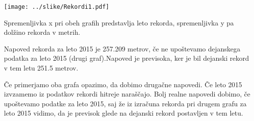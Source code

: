 \documentclass[11pt,a4paper]{article}
\begin{document}
\texttt{[image: ../slike/Rekordi1.pdf]}

Spremenljivka x pri obeh grafih predstavlja leto rekorda, spremenljivka y pa dolžino rekorda v metrih.

Napoved rekorda za leto 2015 je 257.209 metrov, če ne upoštevamo dejanskega podatka za leto 2015 (drugi graf).Napoved je previsoka, ker je bil dejanski rekord v tem letu 251.5 metrov.

Če primerjamo oba grafa opazimo, da dobimo drugačne napovedi. Če leto 2015 izvzamemo iz podatkov rekordi hitreje naraščajo. Bolj realne napovedi dobimo, če upoštevamo podatke za leto 2015, saj že iz izračuna rekorda pri drugem grafu za leto 2015 vidimo, da je previsok glede na dejanski rekord postavljen v tem letu.
\end{document}
